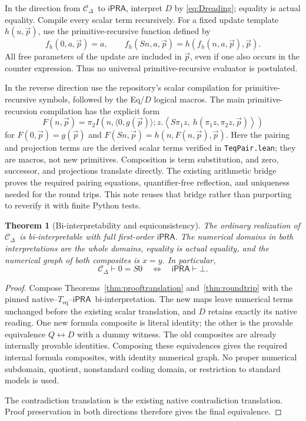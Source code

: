 \documentclass[11pt]{article}
\newtheorem{theorem}{Theorem}[section]
\theoremstyle{definition}\newtheorem{definition}[theorem]{Definition}
\theoremstyle{remark}\newtheorem{remark}[theorem]{Remark}
\newcommand{\ipra}{\ensuremath{\mathsf{iPRA}}}
\newcommand{\Cd}{\ensuremath{\mathcal C_{\Delta}}}
\begin{document}
In the direction from \Cd\ to \ipra, interpret $D$ by \eqref{eq:Dreading}; equality is actual equality. Compile every scalar term recursively. For a fixed update template $h(u,\vec p)$, use the primitive-recursive function defined by
\[
 f_h(0,a,\vec p)=a,\qquad
 f_h(Sn,a,\vec p)=h(f_h(n,a,\vec p),\vec p).
\]
All free parameters of the update are included in $\vec p$, even if one also occurs in the counter expression. Thus no universal primitive-recursive evaluator is postulated.

In the reverse direction use the repository's scalar compilation for primitive-recursive symbols, followed by the Eq/$D$ logical macros. The main primitive-recursion compilation has the explicit form
\begin{equation}\label{eq:prcompile}
 F(n,\vec p)=\pi_2 I\left(n,\langle 0,g(\vec p)\rangle;
 z.\left\langle S\pi_1z,\ h(\pi_1z,\pi_2z,\vec p)\right\rangle\right)
\end{equation}
for $F(0,\vec p)=g(\vec p)$ and $F(Sn,\vec p)=h(n,F(n,\vec p),\vec p)$. Here the pairing and projection terms are the derived scalar terms verified in \texttt{TeqPair.lean}; they are macros, not new primitives. Composition is term substitution, and zero, successor, and projections translate directly. The existing arithmetic bridge proves the required pairing equations, quantifier-free reflection, and uniqueness needed for the round trips. This note reuses that bridge rather than purporting to reverify it with finite Python tests.

\begin{theorem}[Bi-interpretability and equiconsistency]\label{thm:main}
The ordinary realization of \Cd\ is bi-interpretable with full first-order \ipra. The numerical domains in both interpretations are the whole domains, equality is actual equality, and the numerical graph of both composites is $x=y$. In particular,
\[
 \Cd\vdash 0=S0\quad\Longleftrightarrow\quad\ipra\vdash\bot.
\]
\end{theorem}
\begin{proof}
Compose Theorems~\ref{thm:prooftranslation} and~\ref{thm:roundtrip} with the pinned native--$T_{\mathrm{eq}}$--\ipra\ bi-interpretation. The new maps leave numerical terms unchanged before the existing scalar translation, and $D$ retains exactly its native reading. One new formula composite is literal identity; the other is the provable equivalence $Q\leftrightarrow D$ with a dummy witness. The old composites are already internally provable identities. Composing these equivalences gives the required internal formula composites, with identity numerical graph. No proper numerical subdomain, quotient, nonstandard coding domain, or restriction to standard models is used.

The contradiction translation is the existing native contradiction translation. Proof preservation in both directions therefore gives the final equivalence.
\end{proof}
\end{document}

